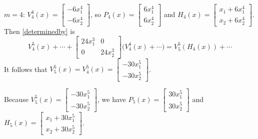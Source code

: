 \documentclass{article}
\theoremstyle{definition}
\begin{document}
$m=4$: $V_4^4(x)=\begin{bmatrix}-6x_1^4\\-6x_2^4\end{bmatrix}$, so $P_4(x)=
\begin{bmatrix}6x_1^4\\6x_2^4\end{bmatrix}$ and $H_4(x)=
\begin{bmatrix}x_1+6x_1^4\\x_2+6x_2^4\end{bmatrix}$.
Then \eqref{determinedby} is
\[
V_4^5(x)+\cdots+\begin{bmatrix}24x_1^3&0\\0&24x_2^3\end{bmatrix}\bigg(V_4^4(x)+\cdots\bigg)
=V_5^5(H_4(x))+\cdots
\]
It follows that $V_5^5(x)=V_4^5(x)=\begin{bmatrix}-30x_1^5\\-30x_2^5\end{bmatrix}$.

Because 
$V_5^5(x)=\begin{bmatrix}-30x_1^5\\-30x_2^5\end{bmatrix}$, we have
$P_5(x)=\begin{bmatrix}30x_1^5\\30x_2^5\end{bmatrix}$
and $H_5(x)=\begin{bmatrix}x_1+30x_1^5\\x_2+30x_2^5\end{bmatrix}$.
\end{document}
